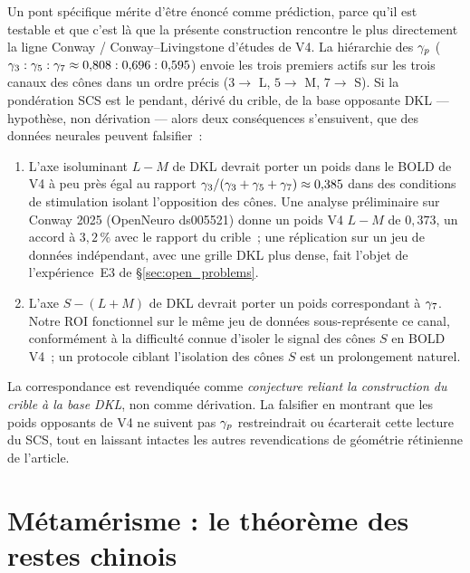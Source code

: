 \documentclass[12pt,a4paper]{article}
\begin{document}
Un pont sp\'ecifique m\'erite d'\^etre \'enonc\'e comme pr\'ediction,
parce qu'il est testable et que c'est l\`a que la pr\'esente
construction rencontre le plus directement la ligne Conway /
Conway--Livingstone d'\'etudes de V4. La hi\'erarchie des $\gamma_{p}$
($\gamma_{3} : \gamma_{5} : \gamma_{7} \approx 0{,}808 : 0{,}696 : 0{,}595$)
envoie les trois premiers actifs sur les trois canaux des c\^ones
dans un ordre pr\'ecis ($3 \to$ L, $5 \to$ M, $7 \to$ S). Si la
pond\'eration SCS est le pendant, d\'eriv\'e du crible, de la base
opposante DKL --- hypoth\`ese, non d\'erivation --- alors deux
cons\'equences s'ensuivent, que des donn\'ees neurales peuvent
falsifier~:

\begin{enumerate}[nosep]
\item L'axe isoluminant $L{-}M$ de DKL devrait porter un poids dans
  le BOLD de V4 \`a peu pr\`es \'egal au rapport
  $\gamma_{3}/(\gamma_{3}+\gamma_{5}+\gamma_{7}) \approx 0{,}385$ dans des
  conditions de stimulation isolant l'opposition des c\^ones. Une
  analyse pr\'eliminaire sur Conway 2025 (OpenNeuro ds005521) donne
  un poids V4 $L{-}M$ de $0{,}373$, un accord \`a $3{,}2\,\%$ avec le
  rapport du crible~; une r\'eplication sur un jeu de donn\'ees
  ind\'ependant, avec une grille DKL plus dense, fait l'objet de
  l'exp\'erience~E3 de \S\ref{sec:open_problems}.
\item L'axe $S{-}(L{+}M)$ de DKL devrait porter un poids correspondant
  \`a $\gamma_{7}$. Notre ROI fonctionnel sur le m\^eme jeu de
  donn\'ees sous-repr\'esente ce canal, conform\'ement \`a la
  difficult\'e connue d'isoler le signal des c\^ones $S$ en BOLD V4~;
  un protocole ciblant l'isolation des c\^ones $S$ est un
  prolongement naturel.
\end{enumerate}

La correspondance est revendiqu\'ee comme \emph{conjecture reliant la
construction du crible \`a la base DKL}, non comme d\'erivation. La
falsifier en montrant que les poids opposants de V4 ne suivent pas
$\gamma_{p}$ restreindrait ou \'ecarterait cette lecture du SCS, tout
en laissant intactes les autres revendications de g\'eom\'etrie
r\'etinienne de l'article.

\section{M\'etam\'erisme : le th\'eor\`eme des restes chinois}
\label{sec:metamerism}
\end{document}
